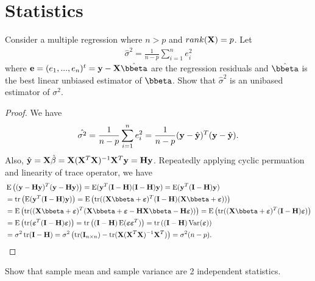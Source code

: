 \section{Statistics}

\begin{problembox}{}{}
Consider a multiple regression where $n > p$ and $rank(\mathbf{X}) = p$. Let
\begin{align*}
	\hat{\sigma}^2 = \frac{1}{n-p}\sum_{i=1}^{n}e_i^2
\end{align*}
where $\be = (e_1,...,e_n)^t = \by - \bX\hat{\bbeta}$ are the regression residuals and $\hat{\bbeta}$ is the best linear unbiased estimator of $\bbeta$. Show that $\hat{\sigma}^2$ is an unibased estimator of $\sigma^2.$
\end{problembox}

\begin{proof}
We have
\begin{align*}
	\hat{\sigma^2} = \frac{1}{n-p}\sum_{i=1}^{n}e_i^2 = \frac{1}{n-p} (\mathbf{y} - \hat{\mathbf{y}})^T(\mathbf{y} - \hat{\mathbf{y}}).
\end{align*}
Also, $\hat{\mathbf{y}} = \mathbf{X}\hat{\beta} = \mathbf{X}(\mathbf{X}^T\mathbf{X})^{-1}\mathbf{X}^T\mathbf{y} = \mathbf{H}\mathbf{y}$. Repeatedly applying cyclic permuation and linearity of trace operator, we have
\begin{align*}
 &\E\left( (\by - \bH\by)^T(\by - \bH\by) \right) = \E(\by^T(\bI - \bH)(\bI - \bH)\by) = \E(\by^T(\bI-\bH)\by) \\
 &= \tr \left( \E(\by^T(\bI-\bH)\by)\right) = \E \left( \tr((\bX\bbeta + \bepsilon)^T(\bI-\bH)(\bX\bbeta + \bepsilon))\right) \\
&= \E \left( \tr((\bX\bbeta + \bepsilon)^T(\bX\bbeta + \bepsilon - \bH\bX\bbeta - \bH \bepsilon))\right) = \E \left( \tr((\bX\bbeta + \bepsilon)^T(\bI-\bH) \bepsilon)\right) \\
&= \E \left( \tr( \bepsilon^T(\bI-\bH)\bepsilon)\right) = \tr\left( (\bI - \bH)\E(\bepsilon\bepsilon^T)\right) = \tr\left((\bI-\bH)\Var(\bepsilon)\right)\\
&= \sigma^2\tr(\bI - \bH) = \sigma^2\left(\tr(\bI_{n \times n}) - \tr(\bX(\bX^T\bX)^{-1}\bX^T)\right) = \sigma^2 (n - p).
\end{align*}
\end{proof}

\begin{problembox}{}{}
Show that sample mean and sample variance are 2 independent statistics. 
\end{problembox}